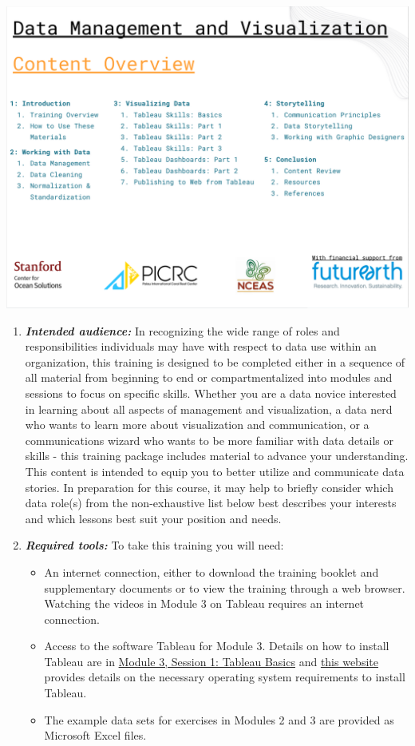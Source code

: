 \documentclass[
]{book}
\providecommand{\tightlist}{%
  \setlength{\itemsep}{0pt}\setlength{\parskip}{0pt}}
\begin{document}
\includegraphics{images/Content_Overview_Intro.png}

\begin{enumerate}
\def\labelenumi{\arabic{enumi}.}
\setcounter{enumi}{3}
\item
  \textbf{\emph{Intended audience:}} In recognizing the wide range of roles and responsibilities individuals may have with respect to data use within an organization, this training is designed to be completed either in a sequence of all material from beginning to end or compartmentalized into modules and sessions to focus on specific skills. Whether you are a data novice interested in learning about all aspects of management and visualization, a data nerd who wants to learn more about visualization and communication, or a communications wizard who wants to be more familiar with data details or skills - this training package includes material to advance your understanding. This content is intended to equip you to better utilize and communicate data stories. In preparation for this course, it may help to briefly consider which data role(s) from the non-exhaustive list below best describes your interests and which lessons best suit your position and needs.
\item
  \textbf{\emph{Required tools:}} To take this training you will need:

  \begin{itemize}
  \tightlist
  \item
    An internet connection, either to download the training booklet and supplementary documents or to view the training through a web browser. Watching the videos in Module 3 on Tableau requires an internet connection.
  \item
    Access to the software Tableau for Module 3. Details on how to install Tableau are in \href{https://nceas.github.io/data-training-picrc-cos/visualizing-data.html\#tableau-basics}{Module 3, Session 1: Tableau Basics} and \href{https://www.tableau.com/products/techspecs\#desktop}{this website} provides details on the necessary operating system requirements to install Tableau.
  \item
    The example data sets for exercises in Modules 2 and 3 are provided as Microsoft Excel files.
  \end{itemize}
\end{enumerate}
\end{document}
